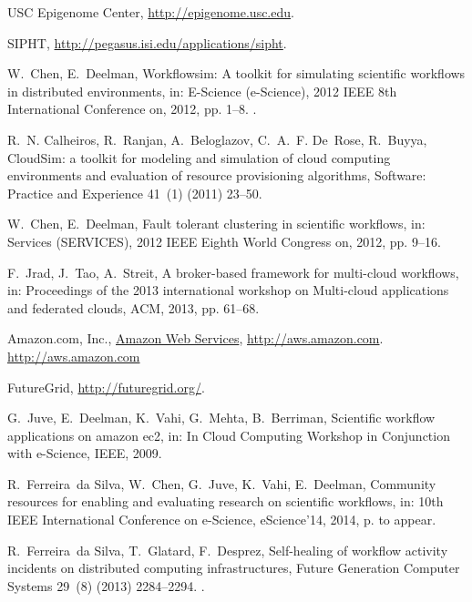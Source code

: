 \documentclass[final,5p,times,twocolumn]{elsarticle}
\begin{document}
\begin{thebibliography}{10}
{USC Epigenome Center}, \url{http://epigenome.usc.edu}.

{SIPHT}, \url{http://pegasus.isi.edu/applications/sipht}.

W.~Chen, E.~Deelman, Workflowsim: A toolkit for simulating scientific workflows
  in distributed environments, in: E-Science (e-Science), 2012 IEEE 8th
  International Conference on, 2012, pp. 1--8.
\newblock \href {http://dx.doi.org/10.1109/eScience.2012.6404430}
  {}.

R.~N. Calheiros, R.~Ranjan, A.~Beloglazov, C.~A.~F. De~Rose, R.~Buyya,
  {CloudSim:} a toolkit for modeling and simulation of cloud computing
  environments and evaluation of resource provisioning algorithms, Software:
  Practice and Experience 41~(1) (2011) 23--50.

W.~Chen, E.~Deelman, Fault tolerant clustering in scientific workflows, in:
  Services (SERVICES), 2012 IEEE Eighth World Congress on, 2012, pp. 9--16.

F.~Jrad, J.~Tao, A.~Streit, A broker-based framework for multi-cloud workflows,
  in: Proceedings of the 2013 international workshop on Multi-cloud
  applications and federated clouds, ACM, 2013, pp. 61--68.

{Amazon.com, Inc.}, \href{http://aws.amazon.com}{{Amazon Web Services}},
  \url{http://aws.amazon.com}.
\newline\urlprefix\url{http://aws.amazon.com}

{FutureGrid}, \url{http://futuregrid.org/}.

G.~Juve, E.~Deelman, K.~Vahi, G.~Mehta, B.~Berriman, Scientific workflow
  applications on amazon ec2, in: In Cloud Computing Workshop in Conjunction
  with e-Science, IEEE, 2009.

R.~Ferreira~da Silva, W.~Chen, G.~Juve, K.~Vahi, E.~Deelman, Community
  resources for enabling and evaluating research on scientific workflows, in:
  10th IEEE International Conference on e-Science, eScience'14, 2014, p. to
  appear.

R.~Ferreira~da Silva, T.~Glatard, F.~Desprez, Self-healing of workflow activity
  incidents on distributed computing infrastructures, Future Generation
  Computer Systems 29~(8) (2013) 2284--2294.
\newblock \href {http://dx.doi.org/10.1016/j.future.2013.06.012}
  {}.

\end{thebibliography}
\end{document}
